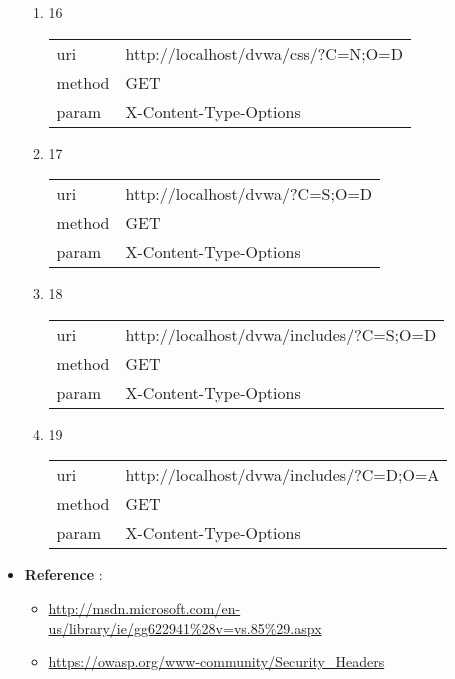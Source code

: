 \documentclass[10pt]{article}
\begin{document}
\begin{itemize}
\begin{enumerate}
\item[] 16
\begin{tabular}{| l | p{12cm}}
uri & http://localhost/dvwa/css/?C=N;O=D \\
method & GET \\
param & X-Content-Type-Options \\
\end{tabular}
\item[] 17
\begin{tabular}{| l | p{12cm}}
uri & http://localhost/dvwa/?C=S;O=D \\
method & GET \\
param & X-Content-Type-Options \\
\end{tabular}
\item[] 18
\begin{tabular}{| l | p{12cm}}
uri & http://localhost/dvwa/includes/?C=S;O=D \\
method & GET \\
param & X-Content-Type-Options \\
\end{tabular}
\item[] 19
\begin{tabular}{| l | p{12cm}}
uri & http://localhost/dvwa/includes/?C=D;O=A \\
method & GET \\
param & X-Content-Type-Options \\
\end{tabular}
\end{enumerate}
\item[] \textbf{Reference} : 
\begin{itemize}
\item \url{http://msdn.microsoft.com/en-us/library/ie/gg622941\%28v=vs.85\%29.aspx}
\item \url{https://owasp.org/www-community/Security\_Headers}
\end{itemize}
\end{itemize}
\end{document}
